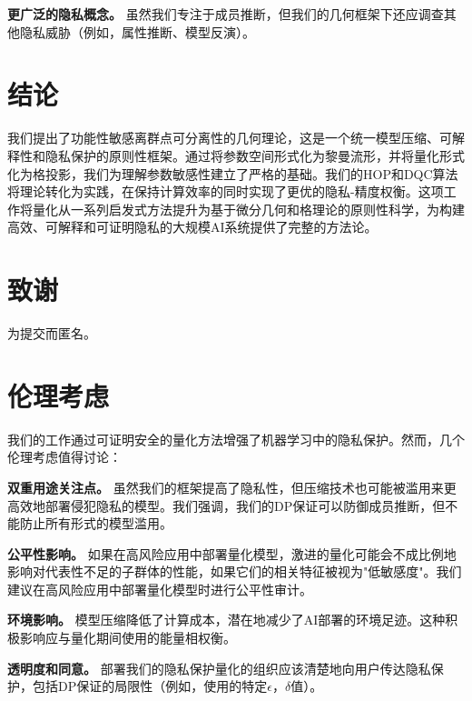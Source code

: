 \documentclass[letterpaper,twocolumn,10pt]{article}
\begin{document}
\textbf{更广泛的隐私概念。} 虽然我们专注于成员推断，但我们的几何框架下还应调查其他隐私威胁（例如，属性推断、模型反演）。

\section{结论}
\label{sec:conclusion}

我们提出了功能性敏感离群点可分离性的几何理论，这是一个统一模型压缩、可解释性和隐私保护的原则性框架。通过将参数空间形式化为黎曼流形，并将量化形式化为格投影，我们为理解参数敏感性建立了严格的基础。我们的HOP和DQC算法将理论转化为实践，在保持计算效率的同时实现了更优的隐私-精度权衡。这项工作将量化从一系列启发式方法提升为基于微分几何和格理论的原则性科学，为构建高效、可解释和可证明隐私的大规模AI系统提供了完整的方法论。

\section*{致谢}

为提交而匿名。

\cleardoublepage
\appendix

\section*{伦理考虑}
\label{sec:ethics}

我们的工作通过可证明安全的量化方法增强了机器学习中的隐私保护。然而，几个伦理考虑值得讨论：

\textbf{双重用途关注点。} 虽然我们的框架提高了隐私性，但压缩技术也可能被滥用来更高效地部署侵犯隐私的模型。我们强调，我们的DP保证可以防御成员推断，但不能防止所有形式的模型滥用。

\textbf{公平性影响。} 如果在高风险应用中部署量化模型，激进的量化可能会不成比例地影响对代表性不足的子群体的性能，如果它们的相关特征被视为"低敏感度"。我们建议在高风险应用中部署量化模型时进行公平性审计。

\textbf{环境影响。} 模型压缩降低了计算成本，潜在地减少了AI部署的环境足迹。这种积极影响应与量化期间使用的能量相权衡。

\textbf{透明度和同意。} 部署我们的隐私保护量化的组织应该清楚地向用户传达隐私保护，包括DP保证的局限性（例如，使用的特定$\epsilon，\delta$值）。
\end{document}
